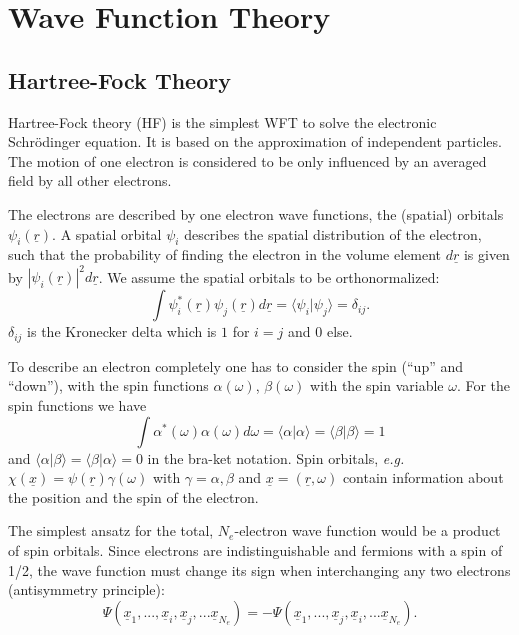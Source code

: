 \documentclass[11pt,DIV=13,BCOR=5mm,a4paper,headinclude]{scrbook}
\renewcommand{\vec}[1]{\underline{#1}}
\begin{document}
\section{Wave Function Theory}
\subsection{Hartree-Fock Theory}
Hartree-Fock theory (HF) is the simplest WFT to solve the electronic Schrödinger equation.
It is based on the approximation of independent particles.
The motion of one electron is considered to be only influenced by an averaged field by all other electrons.


The electrons are described by one electron wave functions, the (spatial) orbitals $\psi_i(\vec{r})$.
A spatial orbital $\psi_i$ describes the spatial distribution of the electron, such that the probability of finding the electron in the volume element $d\vec{r}$ is given by $|\psi_i(\vec{r})|^2d\vec{r}$.
We assume the spatial orbitals to be orthonormalized:
\begin{equation}
\int \psi_i^\ast(\vec{r})\psi_j(\vec{r})d\vec{r}=\langle\psi_i|\psi_j\rangle=\delta_{ij}.
\end{equation}
$\delta_{ij}$ is the Kronecker delta which is $1$ for $i=j$ and $0$ else.


To describe an electron completely one has to consider the spin (``up'' and ``down''), with the spin functions $\alpha(\omega)$, $\beta(\omega)$ with the spin variable $\omega$.
For the spin functions we have
\begin{equation}
\int\alpha^\ast(\omega)\alpha(\omega)d\omega=\langle\alpha|\alpha\rangle=\langle\beta|\beta\rangle=1
\end{equation}
and $\langle\alpha|\beta\rangle=\langle\beta|\alpha\rangle=0$ in the bra-ket notation.
Spin orbitals, \textit{e.g.} $\chi(\vec{x})=\psi(\vec{r})\gamma(\omega)$ with $\gamma=\alpha, \beta$ and $\vec{x}=(\vec{r},\omega)$ contain information about the position and the spin of the electron.


The simplest ansatz for the total, $N_e$-electron wave function would be a product of spin orbitals.
Since electrons are indistinguishable and fermions with a spin of 1/2, the wave function must change its sign when interchanging any two electrons (antisymmetry principle):
\begin{equation}
\Psi(\vec{x}_1,...,\vec{x}_i,\vec{x}_j,...\vec{x}_{N_e})=-\Psi(\vec{x}_1,...,\vec{x}_j,\vec{x}_i,...\vec{x}_{N_e}).
\end{equation}
\end{document}
